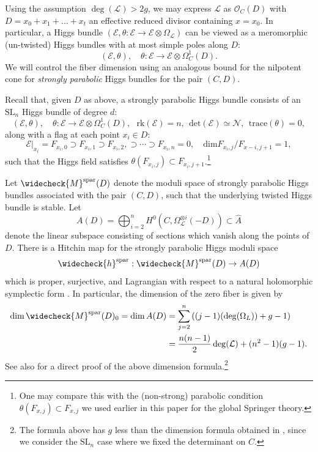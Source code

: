 \documentclass[11pt]{amsart}
\theoremstyle{plain}
\theoremstyle{definition}
\theoremstyle{remark}
\newcommand{\CE}{{\mathcal E}}
\newcommand{\CL}{{\mathcal L}}
\newcommand{\CN}{{\mathcal N}}
\newcommand{\CO}{{\mathcal O}}
\begin{document}
Using the assumption $\deg(\CL)>2g$, we may express $\CL$ as $\CO_C(D)$ with $D = x_0 + x_1 + \dots + x_t$ an effective reduced divisor containing $x = x_0$. In particular, a Higgs bundle $(\CE, \theta: \CE \to \CE\otimes \Omega_\CL)$ can be viewed as a meromorphic (un-twisted) Higgs bundles with at most simple poles along $D$:
\[
(\CE, \theta), \quad \theta: \CE \to \CE \otimes \Omega_C^1(D).
\]
We will control the fiber dimension using an analogous bound for the nilpotent cone for \emph{strongly parabolic} Higgs bundles for the pair $(C,D)$.

Recall that, given $D$ as above, a strongly parabolic Higgs bundle consists of an $\mathrm{SL}_n$ Higgs bundle of degree $d$:
\[
(\CE, \theta), \quad \theta: \CE\to \CE \otimes \Omega^1_C(D),~~~\mathrm{rk}(\CE) =n,~~\mathrm{det}(\CE)\simeq \CN, ~~\mathrm{trace}(\theta) = 0,
\]
along with a flag at each point $x_i \in D$:
\[
\CE|_{x_i}=F_{x_i,0}  \supset F_{x_i,1} \supset F_{x_i,2}, \supset \cdots \supset F_{x_i,n} = 0, \quad \mathrm{dim} F_{x_i,j}/F_{x-i, j+1} = 1,
\]
such that the Higgs field satisfies $\theta(F_{x_i, j}) \subset F_{x_i, j+1}$.\footnote{One may compare this with the (non-strong) parabolic condition $\theta(F_{x,j}) \subset F_{x,j}$ we used earlier in this paper for the global Springer theory.}




Let $\widecheck{M}^{\mathrm{spar}}(D)$ denote the moduli space of strongly parabolic Higgs bundles associated with the pair $(C,D)$, such that the underlying twisted Higgs bundle is stable. Let
$$A(D) = \bigoplus_{i=2}^{n} H^0(C, \Omega_\CL^{\otimes i}(-D)) \subset \widehat{A}$$
denote the linear subspace consisting of sections which vanish along the points of $D$. There is a Hitchin map for the strongly parabolic Higgs moduli space
$$\widecheck{h}^{\mathrm{spar}}:\widecheck{M}^{\mathrm{spar}}(D) \rightarrow A(D)$$
which is proper, surjective, and Lagrangian with respect to a natural holomorphic symplectic form \cite{Faltings}. In particular, the dimension of the zero fiber is given by
\begin{align*}
\dim \widecheck{M}^{\mathrm{spar}}(D)_0 = \dim A(D) &= \sum_{j=2}^{n} \left((j-1)(\deg(\Omega_L)) +g-1\right)\\
&= \frac{n(n-1)}{2}\deg (\CL) + (n^2-1)(g-1).
\end{align*}
See also \cite[Theorem 6.9]{SWW} for a direct proof of the above dimension formula.\footnote{The formula above has $g$ less than the dimension formula obtained in \cite[Theorem 6.9]{SWW}, since we consider the $\mathrm{SL}_n$ case where we fixed the determinant on $C$.}
\end{document}
